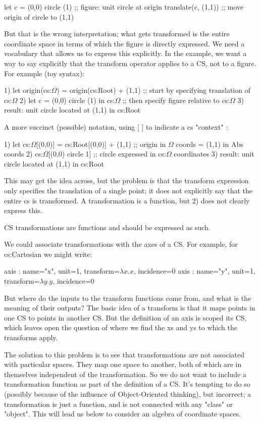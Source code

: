 \documentclass[12pt]{tufte-handout}
\numberwithin{equation}{subsection}
\numberwithin{equation}{subsection}
\begin{document}
  let c = (0,0) circle (1)  ;; figure: unit circle at origin
  translate(c, (1,1))	      ;; move origin of circle to (1,1)

  But that is the wrong interpretation; what gets transformed is the
  entire coordinate space in terms of which the figure is directly
  expressed.  We need a vocabulary that allows us to express this
  explicitly.  In the example, we want a way to say explicitly that the
  transform operator applies to a CS, not to a figure.  For example (toy syntax):

  1)	  let origin(cs:$\Omega$) = origin(cs:Root) + (1,1)  ;; start by specifying translation of cs:$\Omega$
  2)	  let c = (0,0) circle (1) in cs:$\Omega$  ;; then specify figure relative to cs:$\Omega$
  3)	  result: unit circle located at (1,1) in cs:Root

  A more succinct (possible) notation, using [ ] to indicate a cs "context" :

  1)	  let cs:$\Omega$[(0,0)] = cs:Root[(0,0)] + (1,1)  ;; origin in $\Omega$ coords = (1,1) in Abs coords
  2)	  cs:$\Omega$[(0,0) circle 1]   ;; circle expressed in cs:$\Omega$ coordinates
  3)	  result: unit circle located at (1,1) in cs:Root

  This may get the idea across, but the problem is that the transform
  expression only specifies the translation of a single point; it does
  not explicitly say that the entire cs is transformed.  A
  transformation is a function, but 2) does not clearly express this.

  CS transformations are functions and should be expressed as such.

  We could associate transformations with the axes of a CS.  For
  example, for cs:Cartesian we might write:

  axis : {name="x", unit=1, transform=\(\lambda x.x\), incidence=0}
  axis : {name="y", unit=1, transform=\(\lambda y.y\), incidence=0}

  But where do the inputs to the transform functions come from, and what
  is the meaning of their outputs?  The basic idea of a transform is
  that it maps points in one CS to points in another CS.  But the
  definition of an axis is scoped its CS, which leaves open the question
  of where we find the xs and ys to which the transforms apply.

  The solution to this problem is to see that transformations are not
  associated with particular spaces.  They map one space to another,
  both of which are in themselves independent of the transformation.  So
  we do not want to include a transformation function as part of the
  definition of a CS.  It's tempting to do so (possibly because of the
  influence of Object-Oriented thinking), but incorrect; a
  transformation is just a function, and is not connected with any
  "class" or "object".  This will lead us below to consider an algebra
  of coordinate spaces.
\end{document}
